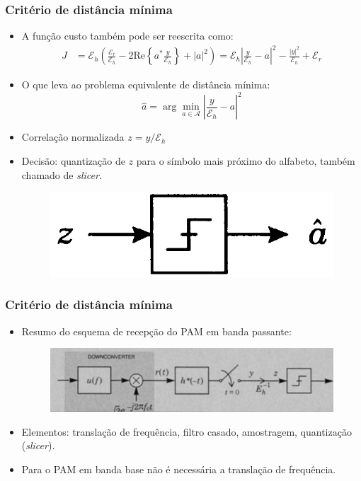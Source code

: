 \begin{frame}
	\frametitle{Critério de distância mínima}

	\begin{itemize}
	    \item A função custo também pode ser reescrita como:
	    \begin{align*}
		J &= \mathcal{E}_h \left( \frac{\mathcal{E}_r}{\mathcal{E}_h} -2\mathrm{Re} \left\{ a^* \frac{y}{\mathcal{E}_h} \right\} + |a|^2 \right) = \mathcal{E}_h \left| \frac{y}{\mathcal{E}_h} - a  \right|^2 - \frac{|y|^2}{\mathcal{E}_h} + \mathcal{E}_r
	    \end{align*}
	    \item O que leva ao problema equivalente de distância mínima:
	    \begin{equation*}
		\hat{a} = \arg\min_{a \in \mathcal{A}} \left| \frac{y}{\mathcal{E}_h} - a \right|^2
	    \end{equation*}
	    \item Correlação normalizada $z = y / \mathcal{E}_h$
	    \item Decisão: quantização de $z$ para o símbolo mais próximo do alfabeto, também chamado de \textit{slicer}.
	    \begin{figure}[t]	
	    \begin{center}
	      \includegraphics[width=0.25\columnwidth]{figs/pam_27}
	    \end{center} 
	  \end{figure}
	\end{itemize}		
\end{frame}

\begin{frame}
	\frametitle{Critério de distância mínima}

	\begin{itemize}
	    \item Resumo do esquema de recepção do PAM em banda passante:
	    \begin{figure}[t]	
	    \begin{center}
	      \includegraphics[width=0.8\columnwidth]{figs/pam_28}
	    \end{center} 
	  \end{figure}
	    \item Elementos: translação de frequência, filtro casado, amostragem, quantização (\textit{slicer}).
	    \item Para o PAM em banda base não é necessária a translação de frequência.
	\end{itemize}		
\end{frame}

